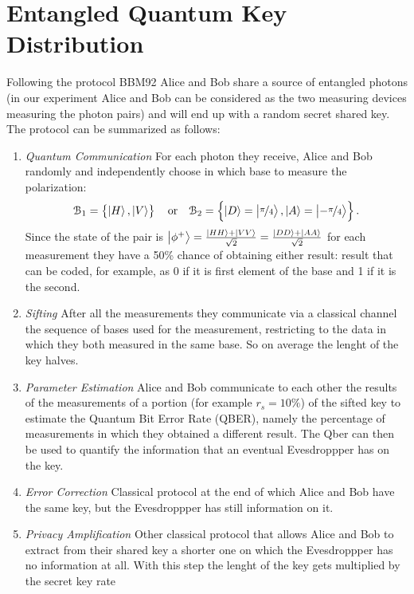 \documentclass[a4paper, 11pt]{article}
\begin{document}
  \section{Entangled Quantum Key Distribution}
    Following the protocol BBM92 Alice and Bob share a source of entangled photons (in our experiment Alice and Bob can be considered as the two measuring devices measuring the photon pairs) and will end up with a random secret shared key. The protocol can be summarized as follows:
    \begin{enumerate}
      \item \emph{Quantum Communication} For each photon they receive, Alice and Bob randomly and independently choose in which base to measure the polarization:
      \begin{gather*}
        \mathcal{B}_1 = \left\{ \ket{H}, \ket{V} \right\}
        \quad \text{or} \quad
        \mathcal{B}_2 = \left\{ \ket{D} = \ket{\frac[f]{\pi}{4}}, \ket{A} = \ket{-\frac[f]{\pi}{4}} \right\}.
      \end{gather*}
      Since the state of the pair is $\ket{\phi^+} = \frac{\ket{HH} + \ket{VV}}{\sqrt{2}} = \frac{\ket{DD} + \ket{AA}}{\sqrt{2}}$ for each measurement they have a 50\% chance of obtaining either result: result that can be coded, for example, as 0 if it is first element of the base and 1 if it is the second.
      \item \emph{Sifting} After all the measurements they communicate via a classical channel the sequence of bases used for the measurement, restricting to the data in which they both measured in the same base. So on average the lenght of the key halves.
      \item \emph{Parameter Estimation} Alice and Bob communicate to each other the results of the measurements of a portion (for example $r_s = 10\%$) of the sifted key to estimate the Quantum Bit Error Rate (QBER), namely the percentage of measurements in which they obtained a different result. The Qber can then be used to quantify the information that an eventual Evesdroppper has on the key.
      \item \emph{Error Correction} Classical protocol at the end of which Alice and Bob have the same key, but the Evesdroppper has still information on it.
      \item \emph{Privacy Amplification} Other classical protocol that allows Alice and Bob to extract from their shared key a shorter one on which the Evesdroppper has no information at all. With this step the lenght of the key gets multiplied by the secret key rate

\end{enumerate}
\end{document}
